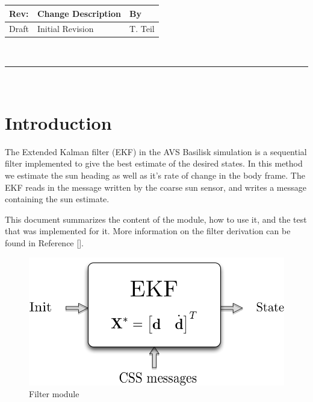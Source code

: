 \documentclass[]{BasiliskReportMemo}
\begin{document}
\makeCover



%
%
\pagestyle{empty}
{\renewcommand{\arraystretch}{2}
\noindent
\begin{longtable}{|p{0.5in}|p{4.5in}|p{1.14in}|}
\hline
{\bfseries Rev}: & {\bfseries Change Description} & {\bfseries By} \\
\hline
Draft & Initial Revision & T. Teil \\
\hline

\end{longtable}
}

\newpage
\setcounter{page}{1}
\pagestyle{fancy}

\tableofcontents
~\\ \hrule ~\\


\section{Introduction}
The Extended Kalman filter (EKF) in the AVS Basilisk simulation is a sequential
filter implemented to give the best estimate of the desired states.
In this method we estimate the sun heading as well as it's rate of change in the body frame.
The EKF reads in the message written by the coarse sun sensor, and writes a message 
containing the sun estimate. 

This document summarizes the content of the module, how to use it, and the test that 
was implemented for it. More information on the filter derivation can be found in Reference [].


\begin{figure}[h]
\centering
            \includegraphics[height=0.3\textwidth,keepaspectratio]{Figures/SchematicEKF.png}
\caption{Filter module}
\end{figure}
\end{document}
